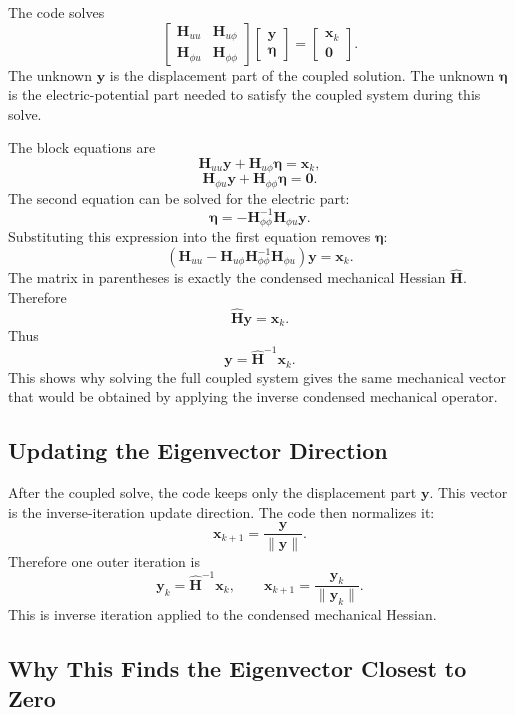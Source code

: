 \documentclass[11pt]{article}
\begin{document}
The code solves
\[
    \begin{bmatrix}
        \bm H_{uu} & \bm H_{u\phi} \\
        \bm H_{\phi u} & \bm H_{\phi\phi}
    \end{bmatrix}
    \begin{bmatrix}
        \bm y \\
        \bm \eta
    \end{bmatrix}
    =
    \begin{bmatrix}
        \bm x_k \\
        \bm 0
    \end{bmatrix}.
\]
The unknown \(\bm y\) is the displacement part of the coupled solution.
The unknown \(\bm \eta\) is the electric-potential part needed to satisfy
the coupled system during this solve.

The block equations are
\[
    \bm H_{uu}\bm y + \bm H_{u\phi}\bm \eta = \bm x_k,
\]
\[
    \bm H_{\phi u}\bm y + \bm H_{\phi\phi}\bm \eta = \bm 0.
\]
The second equation can be solved for the electric part:
\[
    \bm \eta =
    -\bm H_{\phi\phi}^{-1}\bm H_{\phi u}\bm y.
\]
Substituting this expression into the first equation removes
\(\bm \eta\):
\[
    \left(
        \bm H_{uu}
        -
        \bm H_{u\phi}
        \bm H_{\phi\phi}^{-1}
        \bm H_{\phi u}
    \right)\bm y
    =
    \bm x_k.
\]
The matrix in parentheses is exactly the condensed mechanical Hessian
\(\widehat{\bm H}\). Therefore
\[
    \widehat{\bm H}\bm y = \bm x_k.
\]
Thus
\[
    \bm y = \widehat{\bm H}^{-1}\bm x_k.
\]
This shows why solving the full coupled system gives the same
mechanical vector that would be obtained by applying the inverse
condensed mechanical operator.

\subsection*{Updating the Eigenvector Direction}

After the coupled solve, the code keeps only the displacement part
\(\bm y\). This vector is the inverse-iteration update direction. The
code then normalizes it:
\[
    \bm x_{k+1}
    =
    \frac{\bm y}{\|\bm y\|}.
\]
Therefore one outer iteration is
\[
    \bm y_k = \widehat{\bm H}^{-1}\bm x_k,
    \qquad
    \bm x_{k+1} = \frac{\bm y_k}{\|\bm y_k\|}.
\]
This is inverse iteration applied to the condensed mechanical Hessian.

\subsection*{Why This Finds the Eigenvector Closest to Zero}
\end{document}
